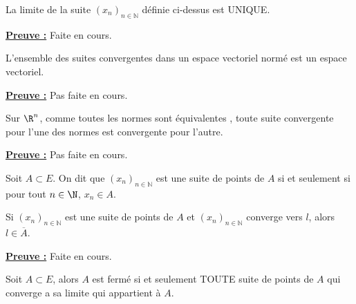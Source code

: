 \documentclass[class=report,crop=false]{standalone}
\begin{document}
 
\begin{proposition}
\textcolor[rgb]{0.50,0.00,0.25}{
La limite de la suite $\left(x_n\right)_{n\in\mathbb{N}}$ définie ci-dessus est UNIQUE.
}
\end{proposition}

\noindent \underline{\bf Preuve :}
Faite en cours.



\begin{proposition}
\textcolor[rgb]{0.50,0.00,0.25}{
L'ensemble des suites convergentes dans un espace vectoriel normé est un espace vectoriel.
}
\end{proposition}

\noindent \underline{\bf Preuve :}
Pas faite en cours.
 

\begin{proposition}
\textcolor[rgb]{0.50,0.00,0.25}{
Sur $\R^n$, comme toutes les normes sont équivalentes , toute suite convergente pour l'une des normes
est convergente pour l'autre.
}
\end{proposition}

\noindent \underline{\bf Preuve :}
Pas faite en cours.


 
 
\begin{definition}
\textcolor[rgb]{0.73,0.00,0.00}{
Soit $A \subset E$. On dit que $\left(x_n\right)_{n\in\mathbb{N}}$ est une suite de points de $A$
si et seulement si pour tout $n \in \N$, $x_n \in A$.
}
 \end{definition}
 
  

\begin{proposition}
\textcolor[rgb]{0.50,0.00,0.25}{
Si $\left(x_n\right)_{n\in\mathbb{N}}$ est une suite de points de $A$ et $\left(x_n\right)_{n\in\mathbb{N}}$ converge vers $l$, alors $l \in \overline{A}$.
}
\end{proposition}

 \noindent \underline{\bf Preuve :}
Faite en cours.

\begin{proposition}
\textcolor[rgb]{0.50,0.00,0.25}{ 
Soit $A \subset E$, alors $A$ est fermé si et seulement TOUTE suite de points de $A$ qui 
converge a sa limite qui appartient à $A$.
}
\end{proposition}
\end{document}

